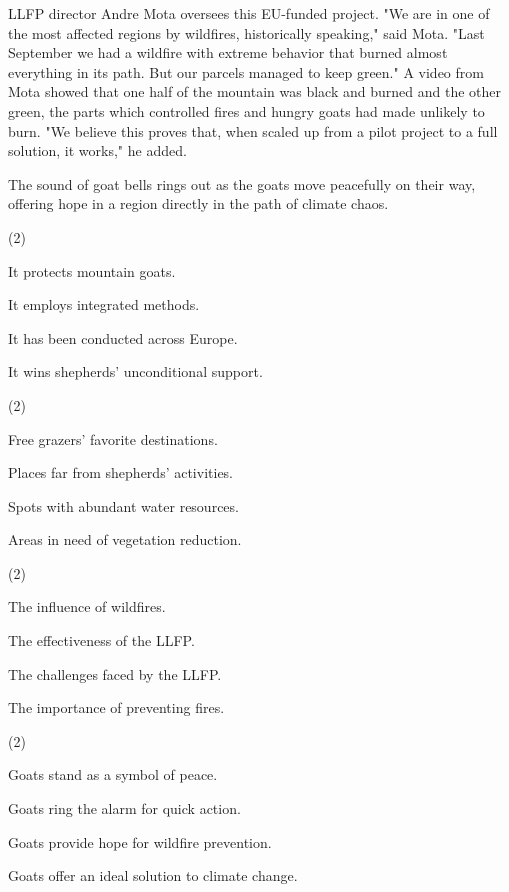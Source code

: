 \documentclass{英语试卷}
\begin{document}
\par LLFP director Andre Mota oversees this EU-funded project. "We are in one of the most affected regions by wildfires, historically speaking," said Mota. "Last September we had a wildfire with extreme behavior that burned almost everything in its path. But our parcels managed to keep green." A video from Mota showed that one half of the mountain was black and burned and the other green, the parts which controlled fires and hungry goats had made unlikely to burn. "We believe this proves that, when scaled up from a pilot project to a full solution, it works," he added.\par
\par The sound of goat bells rings out as the goats move peacefully on their way, offering hope in a region directly in the path of climate chaos.\par
{}
\begin{choices}(2)
  \item It protects mountain goats.
  \item It employs integrated methods.
  \item It has been conducted across Europe.
  \item It wins shepherds' unconditional support.
\end{choices}
\begin{choices}(2)
  \item Free grazers' favorite destinations.
  \item Places far from shepherds' activities.
  \item Spots with abundant water resources.
  \item Areas in need of vegetation reduction.
\end{choices}
\begin{choices}(2)
  \item The influence of wildfires.
  \item The effectiveness of the LLFP.
  \item The challenges faced by the LLFP.
  \item The importance of preventing fires.
\end{choices}
\begin{choices}(2)
  \item Goats stand as a symbol of peace.
  \item Goats ring the alarm for quick action.
  \item Goats provide hope for wildfire prevention.
  \item Goats offer an ideal solution to climate change.
\end{choices}
\end{document}
